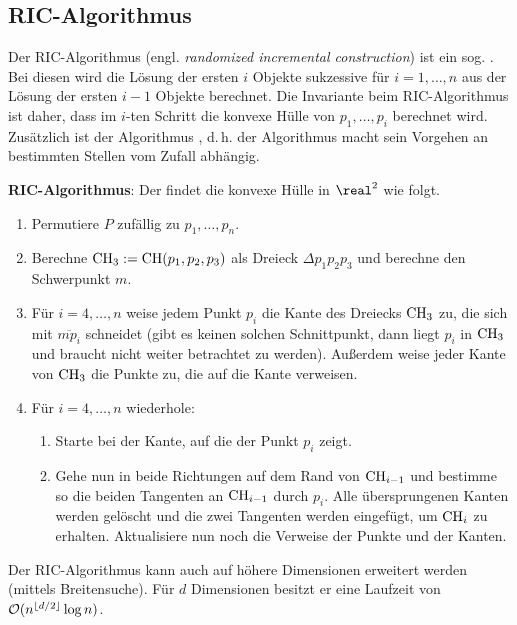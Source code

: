 \pagebreak

\subsection{%
    RIC-Algorithmus%
}

Der RIC-Algorithmus (engl. \emph{randomized incremental construction}) ist ein sog.
.
Bei diesen wird die Lösung der ersten $i$ Objekte sukzessive für $i = 1, \dotsc, n$ aus
der Lösung der ersten $i - 1$ Objekte berechnet.
Die Invariante beim RIC-Algorithmus ist daher, dass im $i$-ten Schritt die konvexe
Hülle von $p_1, \dotsc, p_i$ berechnet wird.
Zusätzlich ist der Algorithmus , d.\,h.
der Algorithmus macht sein Vorgehen an bestimmten Stellen vom Zufall abhängig.

\textbf{RIC-Algorithmus}:
Der  findet die konvexe Hülle in $\real^2$ wie folgt.
\begin{enumerate}
    \item
    Permutiere $P$ zufällig zu $p_1, \dotsc, p_n$.
    
    \item
    Berechne $\operatorname{CH}_3 := \operatorname{CH}(p_1, p_2, p_3)$ als Dreieck $\Delta p_1 p_2 p_3$ und
    berechne den Schwerpunkt $m$.
    
    \item
    Für $i = 4, \dotsc, n$ weise jedem Punkt $p_i$ die Kante des Dreiecks $\operatorname{CH}_3$ zu,
    die sich mit $\overline{mp_i}$ schneidet
    (gibt es keinen solchen Schnittpunkt, dann liegt $p_i$ in $\operatorname{CH}_3$ und braucht nicht weiter
    betrachtet zu werden).
    Außerdem weise jeder Kante von $\operatorname{CH}_3$ die Punkte zu, die auf die Kante verweisen.
    
    \item
    Für $i = 4, \dotsc, n$ wiederhole:
    \begin{enumerate}[label=\emph{(\roman*)}]
        \item
        Starte bei der Kante, auf die der Punkt $p_i$ zeigt.
        
        \item
        Gehe nun in beide Richtungen auf dem Rand von $\operatorname{CH}_{i-1}$ und bestimme so
        die beiden Tangenten an $\operatorname{CH}_{i-1}$ durch $p_i$.
        Alle übersprungenen Kanten werden gelöscht und die zwei Tangenten werden eingefügt,
        um $\operatorname{CH}_i$ zu erhalten.
        Aktualisiere nun noch die Verweise der Punkte und der Kanten.
    \end{enumerate}
\end{enumerate}
Der RIC-Algorithmus kann auch auf höhere Dimensionen erweitert werden
(mittels Breitensuche).
Für $d$ Dimensionen besitzt er eine Laufzeit von $\mathcal{O}(n^{\lfloor d/2 \rfloor} \log n)$.

